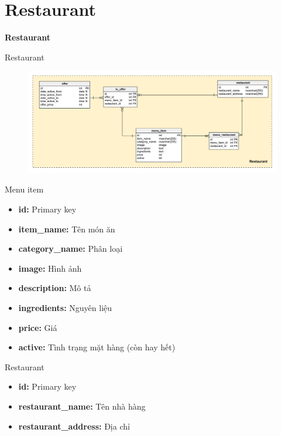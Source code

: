 \documentclass[aspectratio=43,xcolor=dvipsnames]{beamer}
\begin{document}
	\section{Restaurant}
	\begin{frame}
		\textcolor{structure}{\Huge{\textbf{Restaurant}}}
	\end{frame}
	\begin{frame}{Restaurant}
		\begin{figure}[ht!]
			\centerline{\includegraphics[width=1\textwidth]{restaurant.png}}
			\label{fig:ass1}
		\end{figure}
	\end{frame}
	\begin{frame}{Menu item}
		\begin{itemize}
			\item \textbf{id:} Primary key
			\item \textbf{item\_name:} Tên món ăn
			\item \textbf{category\_name:} Phân loại
			\item \textbf{image:} Hình ảnh
			\item \textbf{description:} Mô tả
			\item \textbf{ingredients:} Nguyên liệu
			\item \textbf{price:} Giá
			\item \textbf{active:} Tình trạng mặt hàng (còn hay hết)
		\end{itemize}
	\end{frame}
	
	\begin{frame}{Restaurant}
		\begin{itemize}
			\item \textbf{id:} Primary key
			\item \textbf{restaurant\_name:} Tên nhà hàng
			\item \textbf{restaurant\_address:} Địa chỉ
		\end{itemize}
	\end{frame}
	
\end{document}
